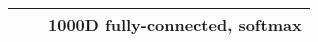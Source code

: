 \begin{table}[H]
{\begin{tabular}{|c|c|c|l|l|l|}
                                                                                        &                 & \multicolumn{4}{c|}{1000D fully-connected, softmax}                                                                                                                                                                                                                                                                                                                                                                                               \\ \hline
    \end{tabular}
    }
\end{table}

